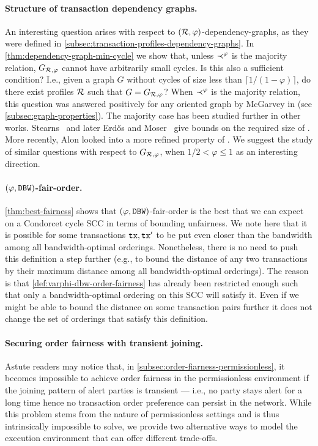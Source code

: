 \paragraph{Structure of transaction dependency graphs.}
%
An interesting question arises with respect to $(\mathcal{R},\varphi)$-dependency-graphs, as they were defined in \cref{subsec:transaction-profiles-dependency-graphs}.
%
In \cref{thm:dependency-graph-min-cycle} we show that, unless $\prec^\varphi$ is the majority relation, $G_{\mathcal{R},\varphi}$ cannot have arbitrarily small cycles.
%
Is this also a sufficient condition?
%
I.e., given a graph $G$ without cycles of size less than $\lceil1/(1-\varphi)\rceil$, do there exist profiles $\mathcal{R}$ such that $G = G_{\mathcal{R},\varphi}$?
%
When $\prec^\varphi$ is the majority relation, this question was answered positively for any oriented graph by McGarvey in \cite{McGarvey53} (see \cref{subsec:graph-properties}).
%
The majority case has been studied further in other works.
%
Stearns~\cite{Stearns59} and later Erd\H{o}s and Moser~\cite{ErdMos64} give bounds on the required size of \profileSet.
%
More recently, Alon \cite{AAM:Alon02} looked into a more refined property of \profileSet.
%
We suggest the study of similar questions with respect to $G_{\mathcal{R},\varphi}$, when $1/2<\varphi\le1$ as an interesting direction.

\paragraph{$(\varphi,\mathtt{DBW})$-fair-order.}
%
\cref{thm:best-fairness} shows that $(\varphi, \mathtt{DBW})$-fair-order is the best that we can expect on a Condorcet cycle SCC in terms of bounding unfairness. 
%
We note here that it is possible for some transactions $\mathtt{tx}, \mathtt{tx}'$ to be put even closer than the bandwidth among all bandwidth-optimal orderings.
%
Nonetheless, there is no need to push this definition a step further (e.g., to bound the distance of any two transactions by their maximum distance among all bandwidth-optimal orderings).
%
The reason is that \cref{def:varphi-dbw-order-fairness} has already been restricted enough such that only a bandwidth-optimal ordering on this SCC will satisfy it.
%
Even if we might be able to bound the distance on some transaction pairs further it does not change the set of orderings that satisfy this definition.

\paragraph{Securing order fairness with transient joining.}
%
Astute readers may notice that, in \cref{subsec:order-fiarness-permissionless}, it becomes impossible to achieve order fairness in the permissionless environment if the joining pattern of alert parties is transient --- i.e., no party stays alert for a long time hence no transaction order preference can persist in the network.
%
While this problem stems from the nature of permissionless settings and is thus intrinsically impossible to solve, we provide two alternative ways to model the execution environment that can offer different trade-offs. 

